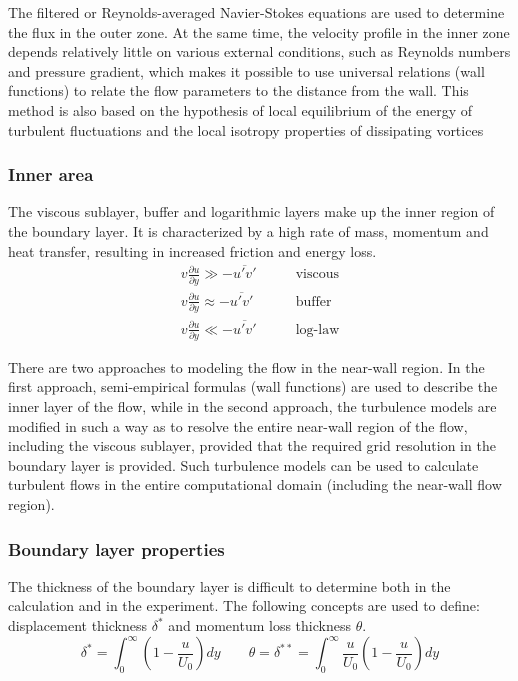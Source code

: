 	The filtered or Reynolds-averaged Navier-Stokes equations are used to determine the flux in the outer zone. At the same time, the velocity profile in the inner zone depends relatively little on various external conditions, such as Reynolds numbers and pressure gradient, which makes it possible to use universal relations (wall functions) to relate the flow parameters to the distance from the wall. This method is also based on the hypothesis of local equilibrium of the energy of turbulent fluctuations and the local isotropy properties of dissipating vortices

\subsubsection{Inner area}
	The viscous sublayer, buffer and logarithmic layers make up the inner region of the boundary layer. It is characterized by a high rate of mass, momentum and heat transfer, resulting in increased friction and energy loss.
	\begin{align}
		v\frac{\partial u}{\partial y} \gg -\overline{u'v'} & \qquad\text{viscous}\nonumber \\
		v\frac{\partial u}{\partial y} \approx -\overline{u'v'} & \qquad\text{buffer}\nonumber \\
		v\frac{\partial u}{\partial y} \ll -\overline{u'v'} & \qquad\text{log-law}
	\end{align}

	There are two approaches to modeling the flow in the near-wall region. In the first approach, semi-empirical formulas (wall functions) are used to describe the inner layer of the flow, while in the second approach, the turbulence models are modified in such a way as to resolve the entire near-wall region of the flow, including the viscous sublayer, provided that the required grid resolution in the boundary layer is provided. Such turbulence models can be used to calculate turbulent flows in the entire computational domain (including the near-wall flow region).
	
\subsubsection{Boundary layer properties}
	The thickness of the boundary layer is difficult to determine both in the calculation and in the experiment. The following concepts are used to define: displacement thickness $\delta^*$ and momentum loss thickness $\theta$.
	\begin{equation}
		\delta^* = \int_{0}^{\infty}(1 - \frac{u}{U_0})dy \qquad \theta = \delta^{**} = \int_{0}^{\infty} \frac{u}{U_0}(1 - \frac{u}{U_0})dy
	\end{equation}

